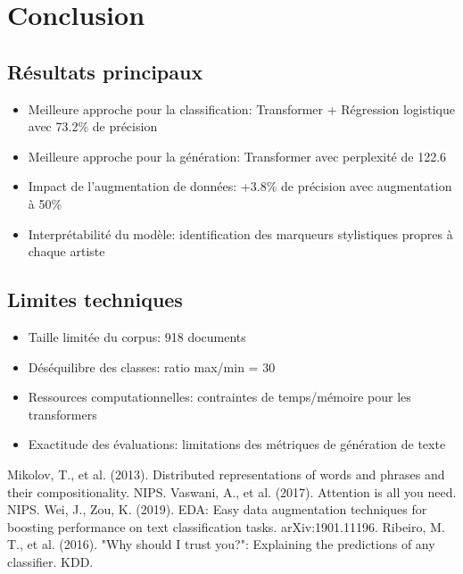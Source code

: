 \documentclass[a4paper,11pt]{article}
\begin{document}
\section{Conclusion}
\label{sec:conclusion}

\subsection{Résultats principaux}
\begin{itemize}
    \item Meilleure approche pour la classification: Transformer + Régression logistique avec 73.2\% de précision
    \item Meilleure approche pour la génération: Transformer avec perplexité de 122.6
    \item Impact de l'augmentation de données: +3.8\% de précision avec augmentation à 50\%
    \item Interprétabilité du modèle: identification des marqueurs stylistiques propres à chaque artiste
\end{itemize}

\subsection{Limites techniques}
\begin{itemize}
    \item Taille limitée du corpus: 918 documents
    \item Déséquilibre des classes: ratio max/min = 30
    \item Ressources computationnelles: contraintes de temps/mémoire pour les transformers
    \item Exactitude des évaluations: limitations des métriques de génération de texte
\end{itemize}


\begin{thebibliography}{9}
 Mikolov, T., et al. (2013). Distributed representations of words and phrases and their compositionality. NIPS.
 Vaswani, A., et al. (2017). Attention is all you need. NIPS.
 Wei, J., Zou, K. (2019). EDA: Easy data augmentation techniques for boosting performance on text classification tasks. arXiv:1901.11196.
 Ribeiro, M. T., et al. (2016). "Why should I trust you?": Explaining the predictions of any classifier. KDD.
\end{thebibliography}
\end{document}
